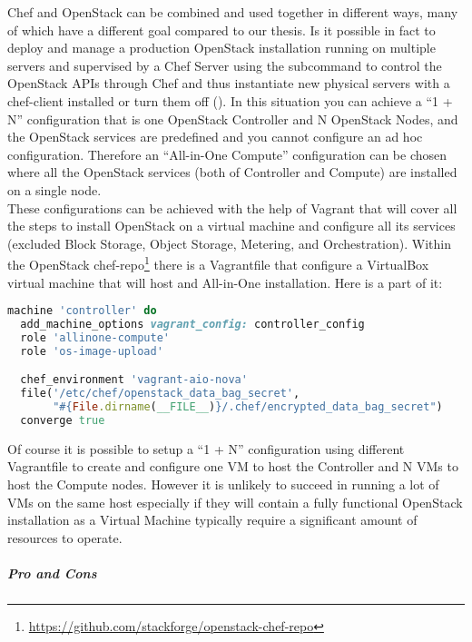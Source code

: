 Chef and OpenStack can be combined and used together in different ways, many of which have a different goal compared to our thesis. Is it possible in fact to deploy and manage a production OpenStack installation running on multiple servers and supervised by a Chef Server using the subcommand  to control the OpenStack APIs through Chef and thus instantiate new physical servers with a chef-client installed or turn them off ().
In this situation you can achieve a ``1 + N'' configuration that is one OpenStack Controller and N OpenStack Nodes, and the OpenStack services are predefined and you cannot configure an ad hoc configuration.
Therefore an ``All-in-One Compute'' configuration can be chosen where all the OpenStack services (both of Controller and Compute) are installed on a single node.\\
These configurations can be achieved with the help of Vagrant that will cover all the steps to install OpenStack on a virtual machine and configure all its services (excluded Block Storage, Object Storage, Metering, and Orchestration). Within the OpenStack chef-repo\footnote{\url{https://github.com/stackforge/openstack-chef-repo}} there is a Vagrantfile that configure a VirtualBox virtual machine that will host and All-in-One installation. Here is a part of it:
\begin{lstlisting}[language=Ruby]
machine 'controller' do
  add_machine_options vagrant_config: controller_config
  role 'allinone-compute'
  role 'os-image-upload'

  chef_environment 'vagrant-aio-nova'
  file('/etc/chef/openstack_data_bag_secret',
       "#{File.dirname(__FILE__)}/.chef/encrypted_data_bag_secret")
  converge true
\end{lstlisting}

Of course it is possible to setup a ``1 + N'' configuration using different Vagrantfile to create and configure one VM to host the Controller and N VMs to host the Compute nodes. However it is unlikely to succeed in running a lot of VMs on the same host especially if they will contain a fully functional OpenStack installation as a Virtual Machine typically require a significant amount of resources to operate.


\subparagraph{Pro and Cons}
\label{subp:sota_chef_pro_cons}

